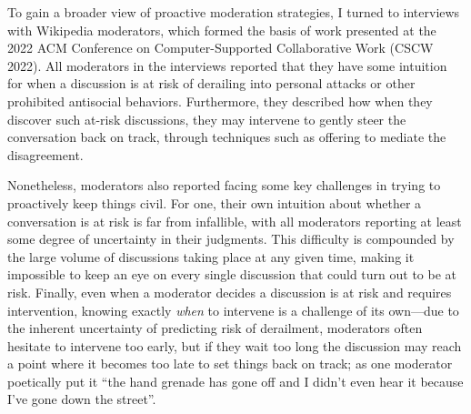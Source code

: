 \documentclass[11pt,letterpaper]{article}
\begin{document}

To gain a broader view of proactive moderation strategies, I turned to interviews with Wikipedia moderators, which formed the basis of work presented at the 2022 ACM Conference on Computer-Supported Collaborative Work (CSCW 2022).
All moderators in the interviews reported that they have some intuition for when a discussion is at risk of derailing into personal attacks or other prohibited antisocial behaviors.
Furthermore, they described how when they discover such at-risk discussions, they may intervene to gently steer the conversation back on track, through techniques such as offering to mediate the disagreement.

Nonetheless, moderators also reported facing some key challenges in trying to proactively keep things civil.
For one, their own intuition about whether a conversation is at risk is far from infallible, with all moderators reporting at least some degree of uncertainty in their judgments.
This difficulty is compounded by the large volume of discussions taking place at any given time, making it impossible to keep an eye on every single discussion that could turn out to be at risk.
Finally, even when a moderator decides a discussion is at risk and requires intervention, knowing exactly \emph{when} to intervene is a challenge of its own---due to the inherent uncertainty of predicting risk of derailment, moderators often hesitate to intervene too early, but if they wait too long the discussion may reach a point where it becomes too late to set things back on track; as one moderator poetically put it ``the hand grenade has gone off and I didn't even hear it because I've gone down the street''.
\end{document}
